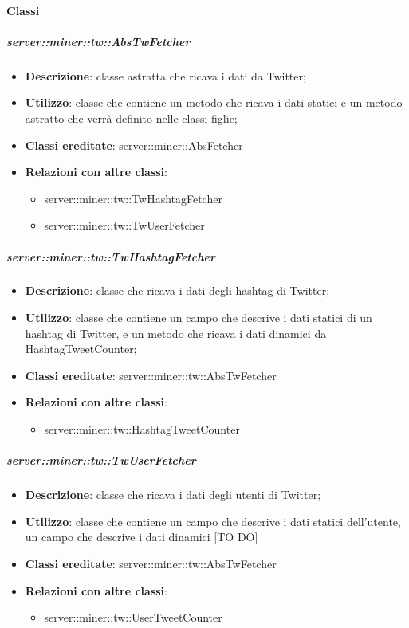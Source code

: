 	\paragraph{Classi} %
	\subparagraph{server::miner::tw::AbsTwFetcher} %
		\label{subp:server_miner_tw_AbsTwFetcher}
			\begin{itemize}
				\item \textbf{Descrizione}: classe astratta che ricava i dati da Twitter;
				\item \textbf{Utilizzo}: classe che contiene un metodo che ricava i dati statici e un metodo astratto che verrà definito nelle classi figlie;
				\item \textbf{Classi ereditate}: server::miner::AbsFetcher
				\item \textbf{Relazioni con altre classi}:
					\begin{itemize}
						\item server::miner::tw::TwHashtagFetcher
						\item server::miner::tw::TwUserFetcher
					\end{itemize}
			\end{itemize}

	\subparagraph{server::miner::tw::TwHashtagFetcher} %
		\label{subp:server_miner_tw_TwHashtagFetcher}
			\begin{itemize}
				\item \textbf{Descrizione}: classe che ricava i dati degli hashtag di Twitter;
				\item \textbf{Utilizzo}: classe che contiene un campo che descrive i dati statici di un hashtag di Twitter, e un metodo che ricava i dati dinamici da HashtagTweetCounter;
				\item \textbf{Classi ereditate}: server::miner::tw::AbsTwFetcher
				\item \textbf{Relazioni con altre classi}:
					\begin{itemize}
						\item server::miner::tw::HashtagTweetCounter
					\end{itemize}
			\end{itemize}

	\subparagraph{server::miner::tw::TwUserFetcher} %
		\label{subp:server_miner_tw_TwUserFetcher}
			\begin{itemize}
				\item \textbf{Descrizione}: classe che ricava i dati degli utenti di Twitter;
				\item \textbf{Utilizzo}: classe che contiene un campo che descrive i dati statici dell'utente, un campo che descrive i dati dinamici [TO DO]
				\item \textbf{Classi ereditate}: server::miner::tw::AbsTwFetcher
				\item \textbf{Relazioni con altre classi}:
					\begin{itemize}
						\item server::miner::tw::UserTweetCounter
					\end{itemize}
			\end{itemize}

